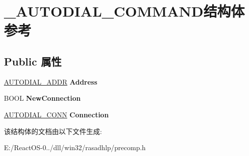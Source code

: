 \hypertarget{struct___a_u_t_o_d_i_a_l___c_o_m_m_a_n_d}{}\section{\+\_\+\+A\+U\+T\+O\+D\+I\+A\+L\+\_\+\+C\+O\+M\+M\+A\+N\+D结构体 参考}
\label{struct___a_u_t_o_d_i_a_l___c_o_m_m_a_n_d}
\subsection*{Public 属性}
\begin{DoxyCompactItemize}
\item 
\mbox{\label{struct___a_u_t_o_d_i_a_l___c_o_m_m_a_n_d_a049a3293612d97f2ae341d1d2010d0e3}} 
\hyperlink{struct___a_u_t_o_d_i_a_l___a_d_d_r}{A\+U\+T\+O\+D\+I\+A\+L\+\_\+\+A\+D\+DR} {\bfseries Address}
\item 
\mbox{\label{struct___a_u_t_o_d_i_a_l___c_o_m_m_a_n_d_a0724fa12d443849591a763dfb31e53da}} 
B\+O\+OL {\bfseries New\+Connection}
\item 
\mbox{\label{struct___a_u_t_o_d_i_a_l___c_o_m_m_a_n_d_afcb9208648125a74be71170b308c9566}} 
\hyperlink{struct___a_u_t_o_d_i_a_l___c_o_n_n}{A\+U\+T\+O\+D\+I\+A\+L\+\_\+\+C\+O\+NN} {\bfseries Connection}
\end{DoxyCompactItemize}


该结构体的文档由以下文件生成\+:\begin{DoxyCompactItemize}
\item 
E\+:/\+React\+O\+S-\/0../dll/win32/rasadhlp/precomp.\+h\end{DoxyCompactItemize}
